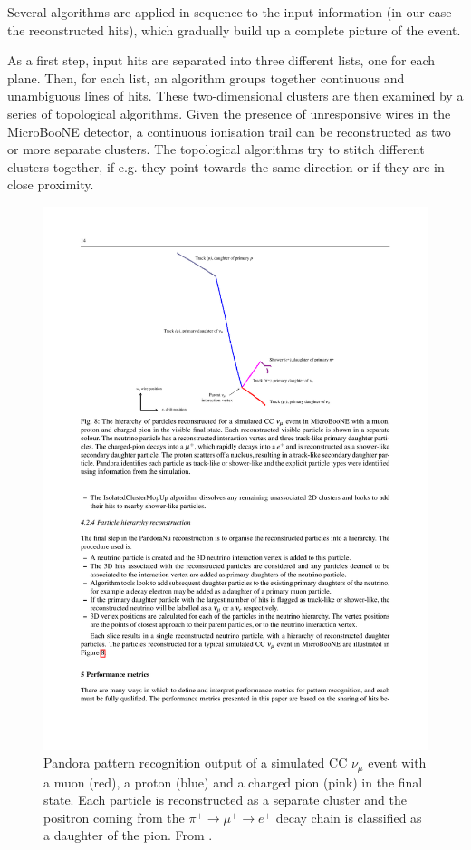Several algorithms are applied in sequence to the input information (in our case the reconstructed hits), which gradually build up a complete picture of the event.

As a first step, input hits are separated into three different lists, one for each plane. Then, for each list, an algorithm groups together continuous and unambiguous lines of hits. These two-dimensional clusters are then examined by a series of topological algorithms. Given the presence of unresponsive wires in the MicroBooNE detector, a continuous ionisation trail can be reconstructed as two or more separate clusters. The topological algorithms try to stitch different clusters together, if e.g. they point towards the same direction or if they are in close proximity. 

\begin{figure}[htbp]
    \centering
    \includegraphics[width=0.75\linewidth]{figures/pandora_evd.pdf}
    \caption{Pandora pattern recognition output of a simulated CC $\nu_{\mu}$ event with a muon (red), a proton (blue) and a charged pion (pink) in the final state. Each particle is reconstructed as a separate cluster and the positron coming from the $\pi^+\rightarrow\mu^+\rightarrow e^+$ decay chain is classified as a daughter of the pion. From \cite{Acciarri:2017hat}.}\label{fig:evd_pandora}
\end{figure}

